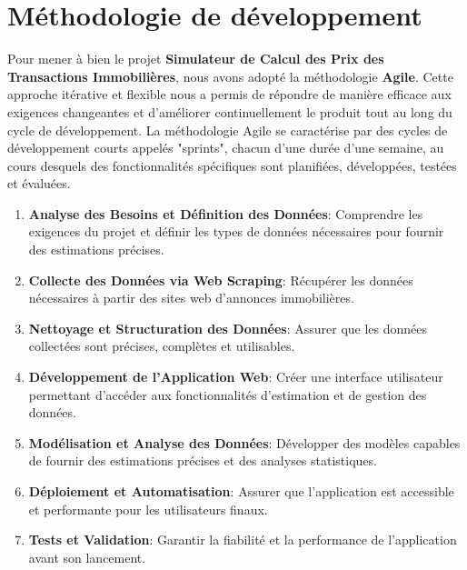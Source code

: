 \documentclass[a4paper,12pt]{report}
\numberwithin{equation}{section}
\begin{document}
\section{Méthodologie de développement}
\vspace{0.5cm}
{\large
\par Pour mener à bien le projet \textbf{Simulateur de Calcul des Prix des Transactions Immobilières}, nous avons adopté la méthodologie \textbf{Agile}. Cette approche itérative et flexible nous a permis de répondre de manière efficace aux exigences changeantes et d'améliorer continuellement le produit tout au long du cycle de développement. La méthodologie Agile se caractérise par des cycles de développement courts appelés "sprints", chacun d'une durée d'une semaine, au cours desquels des fonctionnalités spécifiques sont planifiées, développées, testées et évaluées.\par
}
\vspace*{0.5cm}
\begin{enumerate}
    \item \large{\textbf{Analyse des Besoins et Définition des Données}: Comprendre les exigences du projet et définir les types de données nécessaires pour fournir des estimations précises. }
    \item \large{\textbf{Collecte des Données via Web Scraping}: Récupérer les données nécessaires à partir des sites web d'annonces immobilières. }
    \item \large{\textbf{Nettoyage et Structuration des Données}: Assurer que les données collectées sont précises, complètes et utilisables.}
    \item \large{\textbf{Développement de l'Application Web}: Créer une interface utilisateur permettant d'accéder aux fonctionnalités d'estimation et de gestion des données.}
    \item \large{\textbf{Modélisation et Analyse des Données}: Développer des modèles capables de fournir des estimations précises et des analyses statistiques.}
    \item \large{\textbf{Déploiement et Automatisation}: Assurer que l'application est accessible et performante pour les utilisateurs finaux.}
    \item \large{\textbf{Tests et Validation}: Garantir la fiabilité et la performance de l'application avant son lancement. }
\end{enumerate}
\end{document}
